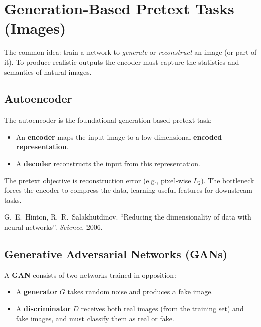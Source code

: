 \documentclass[11pt,a4paper]{article}
\theoremstyle{definition}
\theoremstyle{plain}
\theoremstyle{remark}
\begin{document}
\section{Generation-Based Pretext Tasks (Images)}

The common idea: train a network to \emph{generate} or \emph{reconstruct} an image (or part of it). To produce realistic outputs the encoder must capture the statistics and semantics of natural images.

\subsection{Autoencoder}

The autoencoder is the foundational generation-based pretext task:

\begin{itemize}
    \item An \textbf{encoder} maps the input image to a low-dimensional \textbf{encoded representation}.
    \item A \textbf{decoder} reconstructs the input from this representation.
\end{itemize}

The pretext objective is reconstruction error (e.g., pixel-wise $L_2$). The bottleneck forces the encoder to compress the data, learning useful features for downstream tasks.

\begin{tcolorbox}[colback=blue!5!white,colframe=blue!60!black,title={Reference}]
G.\ E.\ Hinton, R.\ R.\ Salakhutdinov. ``Reducing the dimensionality of data with neural networks''. \textit{Science}, 2006.
\end{tcolorbox}

\subsection{Generative Adversarial Networks (GANs)}

A \textbf{GAN} consists of two networks trained in opposition:

\begin{itemize}
    \item A \textbf{generator} $G$ takes random noise and produces a fake image.
    \item A \textbf{discriminator} $D$ receives both real images (from the training set) and fake images, and must classify them as real or fake.
\end{itemize}
\end{document}
